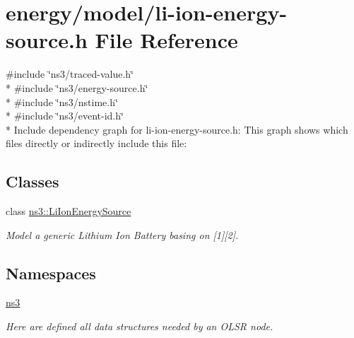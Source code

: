 \hypertarget{li-ion-energy-source_8h}{}\section{energy/model/li-\/ion-\/energy-\/source.h File Reference}
\label{li-ion-energy-source_8h}
{\ttfamily \#include \char`\"{}ns3/traced-\/value.\+h\char`\"{}}\\*
{\ttfamily \#include \char`\"{}ns3/energy-\/source.\+h\char`\"{}}\\*
{\ttfamily \#include \char`\"{}ns3/nstime.\+h\char`\"{}}\\*
{\ttfamily \#include \char`\"{}ns3/event-\/id.\+h\char`\"{}}\\*
Include dependency graph for li-\/ion-\/energy-\/source.h\+:
This graph shows which files directly or indirectly include this file\+:
\subsection*{Classes}
\begin{DoxyCompactItemize}
\item 
class \hyperlink{classns3_1_1LiIonEnergySource}{ns3\+::\+Li\+Ion\+Energy\+Source}
\begin{DoxyCompactList}\small\item\em Model a generic Lithium Ion Battery basing on \mbox{[}1\mbox{]}\mbox{[}2\mbox{]}. \end{DoxyCompactList}\end{DoxyCompactItemize}
\subsection*{Namespaces}
\begin{DoxyCompactItemize}
\item 
 \hyperlink{namespacens3}{ns3}
\begin{DoxyCompactList}\small\item\em Here are defined all data structures needed by an O\+L\+SR node. \end{DoxyCompactList}\end{DoxyCompactItemize}
